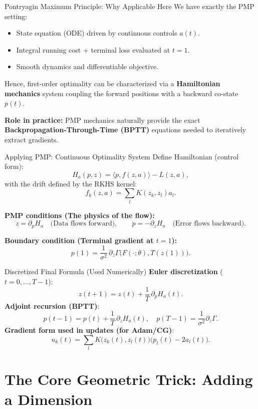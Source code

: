\documentclass[aspectratio=169]{beamer}
\begin{document}
\begin{frame}{Pontryagin Maximum Principle: Why Applicable Here}
We have exactly the PMP setting:
\begin{itemize}
  \item State equation (ODE) driven by continuous controls $a(t)$.
  \item Integral running cost + terminal loss evaluated at $t=1$.
  \item Smooth dynamics and differentiable objective.
\end{itemize}

Hence, first-order optimality can be characterized via a \textbf{Hamiltonian mechanics} system coupling the forward positions with a backward co-state $p(t)$.

\vspace{2mm}
\textbf{Role in practice:} PMP mechanics naturally provide the exact \textbf{Backpropagation-Through-Time (BPTT)} equations needed to iteratively extract gradients.
\end{frame}

\begin{frame}{Applying PMP: Continuous Optimality System}
Define Hamiltonian (control form):
\[
H_a(p,z)=\langle p, f(z,a)\rangle - L(z,a),
\]
with the drift defined by the RKHS kernel:
\[
f_k(z,a)=\sum_l K(z_k,z_l)a_l.
\]

\textbf{PMP conditions (The physics of the flow):}
\[
\dot z = \partial_p H_a \quad \text{(Data flows forward)}, \qquad
\dot p = -\partial_z H_a \quad \text{(Error flows backward)}.
\]

\textbf{Boundary condition (Terminal gradient at $t=1$):}
\[
p(1)=\frac{1}{\sigma^2}\,\partial_z\Gamma\big(F(\cdot;\theta),T(z(1))\big).
\]
\end{frame}

\begin{frame}{Discretized Final Formula (Used Numerically)}
\textbf{Euler discretization} ($t=0,\dots,T-1$):
\[
z(t+1)=z(t)+\frac{1}{T}\,\partial_p H_a(t).
\]
\textbf{Adjoint recursion (BPTT)}:
\[
p(t-1)=p(t)+\frac{1}{T}\,\partial_z H_a(t),
\quad
p(T-1)=\frac{1}{\sigma^2}\partial_z\Gamma.
\]
\textbf{Gradient form used in updates (for Adam/CG)}:
\[
u_k(t)=\sum_l K\big(z_k(t),z_l(t)\big)\big(p_l(t)-2a_l(t)\big).
\]

\end{frame}

\section{The Core Geometric Trick: Adding a Dimension}
\end{document}
